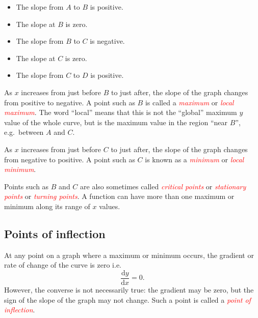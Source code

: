 \documentclass[
  11pt,
  oneside]{book}
\providecommand{\tightlist}{%
  \setlength{\itemsep}{0pt}\setlength{\parskip}{0pt}}
\newcommand{\slide}{}
\theoremstyle{definition}
\theoremstyle{definition}
\theoremstyle{definition}
\theoremstyle{definition}
\theoremstyle{remark}
\begin{document}
\begin{notslides}

\begin{itemize}
\tightlist
\item
  The slope from \(A\) to \(B\) is positive.
\item
  The slope at \(B\) is zero.
\item
  The slope from \(B\) to \(C\) is negative.
\item
  The slope at \(C\) is zero.
\item
  The slope from \(C\) to \(D\) is positive.
\end{itemize}

\end{notslides}

As \(x\) increases from just before \(B\) to just after, the slope of the graph changes from positive to negative. A point such as \(B\) is called a \textcolor{red}{\em maximum} or \textcolor{red}{\em local maximum}. The word ``local'' means that this is not the ``global'' maximum \(y\) value of the whole curve, but is the maximum value in the region ``near \(B\)'', e.g.~between \(A\) and \(C\).

As \(x\) increases from just before \(C\) to just after, the slope of the graph changes from negative to positive. A point such as \(C\) is known as a \textcolor{red}{\em minimum} or \textcolor{red}{\em local minimum}.

Points such as \(B\) and \(C\) are also sometimes called \textcolor{red}{\em critical points} or \textcolor{red}{\em stationary points} or \textcolor{red}{\em turning points}. A function can have more than one maximum or minimum along its range of \(x\) values.
\slide

\subsection{Points of inflection}\label{points-of-inflection}

At any point on a graph where a maximum or minimum occurs, the gradient or rate of change of the curve is zero i.e.
\[
\frac{\mathrm{d} y}{\mathrm{d} x}=0.
\]
However, the converse is not necessarily true: the gradient may be zero, but the sign of the slope of the graph may not change. Such a point is called a \textcolor{red}{\em point of inflection}.
\end{document}

